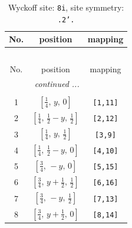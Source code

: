 \documentclass[fleqn,8pt]{jsarticle}
\begin{document}
\begin{longtable}{ccc}
\caption{Wyckoff site: {\tt 8i}, site symmetry: {\tt .2'.}}
 \\
 \hline \hline
No. & position & mapping \\ \hline \endfirsthead

\multicolumn{2}{l}{\tablename\ \thetable{}} \\
 \hline \hline
No. & position & mapping \\ \hline \endhead

 \hline \hline
\multicolumn{2}{r}{\footnotesize\it continued ...} \\ \endfoot

 \hline \hline
\multicolumn{2}{r}{} \\ \endlastfoot

1 & $\left[ \frac{1}{4},\, y,\, 0 \right]$ & {\tt [1,11]} \\ \hline
2 & $\left[ \frac{1}{4},\, \frac{1}{2} - y,\, \frac{1}{2} \right]$ & {\tt [2,12]} \\ \hline
3 & $\left[ \frac{1}{4},\, y,\, \frac{1}{2} \right]$ & {\tt [3,9]} \\ \hline
4 & $\left[ \frac{1}{4},\, \frac{1}{2} - y,\, 0 \right]$ & {\tt [4,10]} \\ \hline
5 & $\left[ \frac{3}{4},\, - y,\, 0 \right]$ & {\tt [5,15]} \\ \hline
6 & $\left[ \frac{3}{4},\, y + \frac{1}{2},\, \frac{1}{2} \right]$ & {\tt [6,16]} \\ \hline
7 & $\left[ \frac{3}{4},\, - y,\, \frac{1}{2} \right]$ & {\tt [7,13]} \\ \hline
8 & $\left[ \frac{3}{4},\, y + \frac{1}{2},\, 0 \right]$ & {\tt [8,14]} \\
\end{longtable}
\renewcommand{\arraystretch}{1.2}
\end{document}
